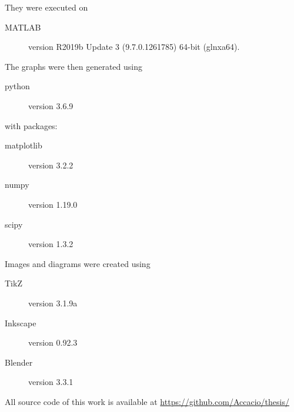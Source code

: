 \documentclass[../main.tex]{subfiles}
\begin{document}
They were executed on
\begin{description}
\item[MATLAB] version R2019b Update 3 (9.7.0.1261785) 64-bit (glnxa64).
\end{description}

The graphs were then generated using
\begin{description}
\item[python] version 3.6.9
\end{description}
with packages:
\begin{description}
    \item[matplotlib] version 3.2.2
    \item[numpy] version 1.19.0
    \item[scipy] version 1.3.2
\end{description}

Images and diagrams were created using
\begin{description}
  \item[TikZ] version 3.1.9a
  \item[Inkscape] version 0.92.3
  \item[Blender] version 3.3.1
\end{description}

All source code of this work is available at \url{https://github.com/Accacio/thesis/}

\end{document}
